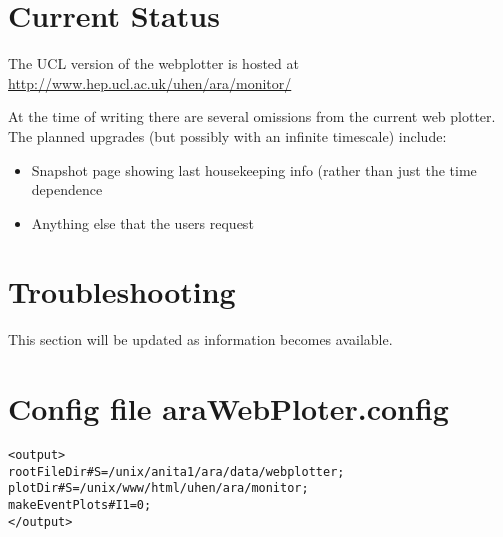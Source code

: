 \documentclass[letterpaper]{article}  %
\begin{document}
\section{Current Status}
The UCL version of the webplotter is hosted at \url{http://www.hep.ucl.ac.uk/uhen/ara/monitor/}

At the time of writing there are several omissions from the current web plotter. The planned upgrades (but possibly with an infinite timescale) include:
\begin{itemize}
\item{Snapshot page showing last housekeeping info (rather than just the time dependence}
\item{Anything else that the users request}
\end{itemize}

\section{Troubleshooting}
This section will be updated as information becomes available.

\newpage

\section{Config file  araWebPloter.config}
\begin{verbatim}
<output>
rootFileDir#S=/unix/anita1/ara/data/webplotter;
plotDir#S=/unix/www/html/uhen/ara/monitor;
makeEventPlots#I1=0;
</output>
\end{verbatim}

 
\end{document}
